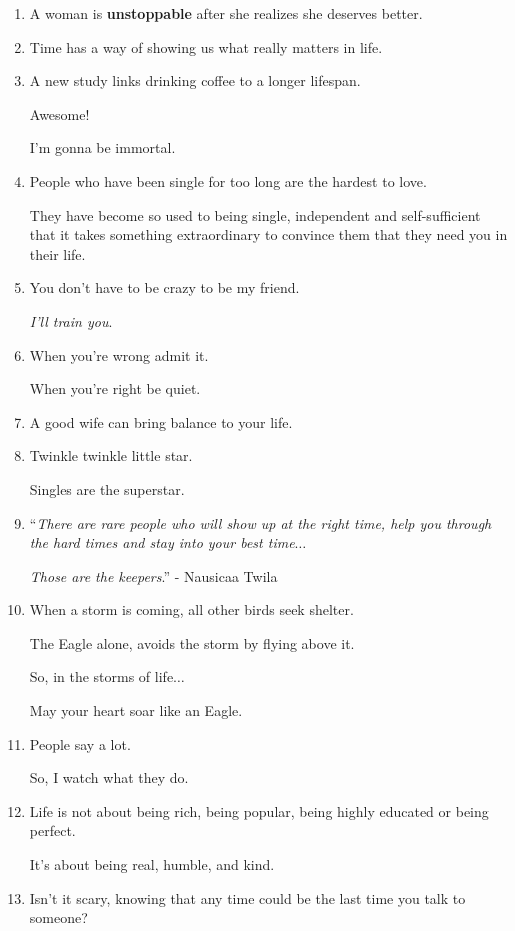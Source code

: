 \documentclass{article}
\numberwithin{equation}{section}
\begin{document}
\begin{enumerate}
    Unless they decide to share it with you, it's none of your business$\ldots$!
    \item A woman is \textbf{unstoppable} after she realizes she deserves better.
    \item Time has a way of showing us what really matters in life.
    \item A new study links drinking coffee to a longer lifespan.
    
    Awesome!
    
    I'm gonna be immortal.
    \item People who have been single for too long are the hardest to love.
    
    They have become so used to being single, independent and self-sufficient that it takes something extraordinary to convince them that they need you in their life.
    \item You don't have to be crazy to be my friend.
    
    \textit{I'll train you}.
    \item When you're wrong admit it.
    
    When you're right be quiet.
    \item A good wife can bring balance to your life.
    \item Twinkle twinkle little star.
    
    Singles are the superstar.
    \item ``\textit{There are rare people who will show up at the right time, help you through the hard times and stay into your best time$\ldots$}
    
    \textit{Those are the keepers}.'' - Nausicaa Twila
    \item When a storm is coming, all other birds seek shelter.
    
    The Eagle alone, avoids the storm by flying above it.
    
    So, in the storms of life$\ldots$
    
    May your heart soar like an Eagle.
    \item People say a lot.
    
    So, I watch what they do.
    \item Life is not about being rich, being popular, being highly educated or being perfect.
    
    It's about being real, humble, and kind.
    \item Isn't it scary, knowing that any time could be the last time you talk to someone?
    

\end{enumerate}
\end{document}
